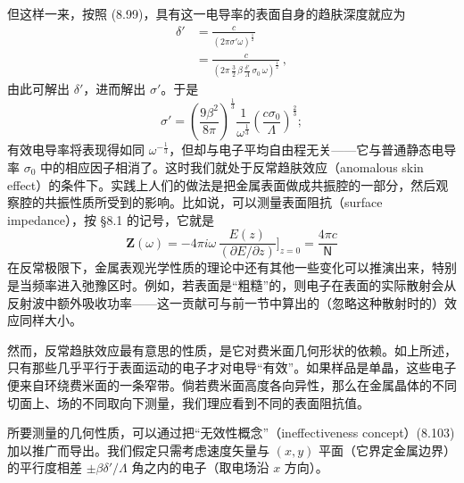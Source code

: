 但这样一来，按照 (8.99)，具有这一电导率的表面自身的趋肤深度就应为
\begin{align*}
\delta' &= \frac{c}{(2\pi\sigma'\omega)^{\frac{1}{2}}} \\
&= \frac{c}{\left(2\pi\,\frac{3}{2}\,\beta\,\frac{\delta'}{\Lambda}\,\sigma_0\,\omega\right)^{\frac{1}{2}}}\,, \tag{8.104}
\end{align*}
由此可解出 $\delta'$，进而解出 $\sigma'$。于是
\begin{equation*}
\sigma' = \left(\frac{9\beta^2}{8\pi}\right)^{\frac{1}{3}} \frac{1}{\omega^{\frac{1}{3}}} \left(\frac{c\sigma_0}{\Lambda}\right)^{\frac{2}{3}}; \tag{8.105}
\end{equation*}
有效电导率将表现得如同 $\omega^{-\frac{1}{3}}$，但却与电子平均自由程无关——它与普通静态电导率 $\sigma_0$ 中的相应因子相消了。这时我们就处于反常趋肤效应（anomalous skin effect）的条件下。实践上人们的做法是把金属表面做成共振腔的一部分，然后观察腔的共振性质所受到的影响。比如说，可以测量表面阻抗（surface impedance），按 §8.1 的记号，它就是
\begin{equation*}
\mathbf{Z}(\omega) = -4\pi i\omega\,\frac{E(z)}{(\partial E/\partial z)}\bigg]_{z=0} = \frac{4\pi c}{\mathsf{N}} \tag{8.106}
\end{equation*}
在反常极限下，金属表观光学性质的理论中还有其他一些变化可以推演出来，特别是当频率进入弛豫区时。例如，若表面是“粗糙”的，则电子在表面的实际散射会从反射波中额外吸收功率——这一贡献可与前一节中算出的（忽略这种散射时的）效应同样大小。

然而，反常趋肤效应最有意思的性质，是它对费米面几何形状的依赖。如上所述，只有那些几乎平行于表面运动的电子才对电导“有效”。如果样品是单晶，这些电子便来自环绕费米面的一条窄带。倘若费米面高度各向异性，那么在金属晶体的不同切面上、场的不同取向下测量，我们理应看到不同的表面阻抗值。

所要测量的几何性质，可以通过把“无效性概念”（ineffectiveness concept）(8.103) 加以推广而导出。我们假定只需考虑速度矢量与 $(x,y)$ 平面（它界定金属边界）的平行度相差 $\pm\beta\delta'/\Lambda$ 角之内的电子（取电场沿 $x$ 方向）。

